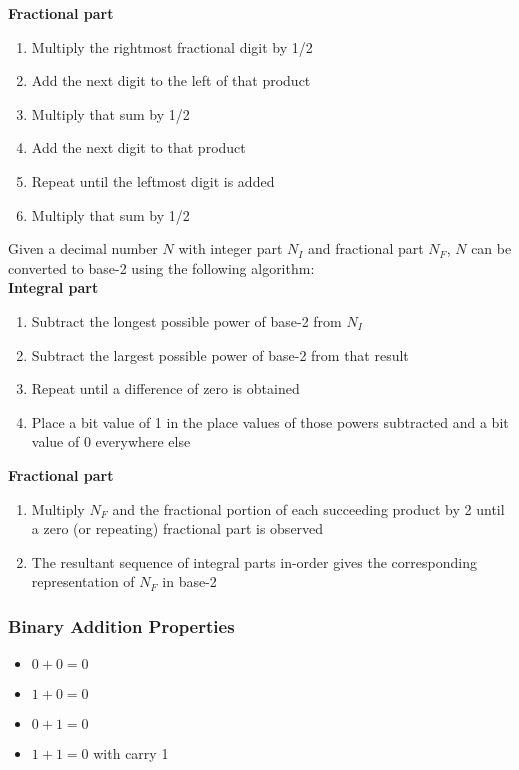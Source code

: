 \documentclass{article}
\begin{document}
	\textbf{Fractional part}
		\begin{enumerate}[label=\arabic*.)]
			\item Multiply the rightmost fractional digit by 1/2
			\item Add the next digit to the left of that product
			\item Multiply that sum by 1/2
			\item Add the next digit to that product
			\item Repeat until the leftmost digit is added
			\item Multiply that sum by 1/2
		\end{enumerate}
	
	Given a decimal number $ N $ with integer part $ N_I $ and fractional part $ N_F $, $ N $ can be converted to base-2 using the following algorithm:\\
	
	\textbf{Integral part}
		\begin{enumerate}[label=\arabic*.)]
			\item Subtract the longest possible power of base-2 from $ N_I $
			\item Subtract the largest possible power of base-2 from that result
			\item Repeat until a difference of zero is obtained
			\item Place a bit value of 1 in the place values of those powers subtracted and a bit value of 0 everywhere else
		\end{enumerate}
	
	\textbf{Fractional part}
		\begin{enumerate}[label=\arabic*.)]
			\item Multiply $ N_F $ and the fractional portion of each succeeding product by 2 until a zero (or repeating) fractional part is observed
			\item The resultant sequence of integral parts in-order gives the corresponding representation of $ N_F $ in base-2
		\end{enumerate}
	
	\subsubsection*{Binary Addition Properties}
	\begin{itemize}
		\item $ 0 + 0 = 0 $
		\item $ 1 + 0 = 0 $
		\item $ 0 + 1 = 0 $
		\item $ 1 + 1 = 0 $ with carry 1
	\end{itemize}
	
\end{document}
